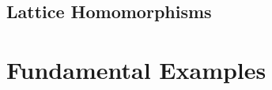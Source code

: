 \documentclass{book}
\begin{document}
	
	
	
	
	
	
	
	
	
	
	
	
	
	
	
	
	
	
	
	
	
	
	
	
	
	
	
	
	
	
	
	
	
	
	
	
	
	
	\subsection{Lattice Homomorphisms}
	
	
	
	
	
	
	
	
	
	
	
	
	
	
	
	
	
	
	
	
	
	
	
	
	
	
	
	
	
	
	
	
	
	
	
	
	
	
	
	
	
	
	
	
	
	
	
	
	\newpage
	\section{Fundamental Examples}
	

	
	
	
	
	
	
	
	
	
	
\end{document}
